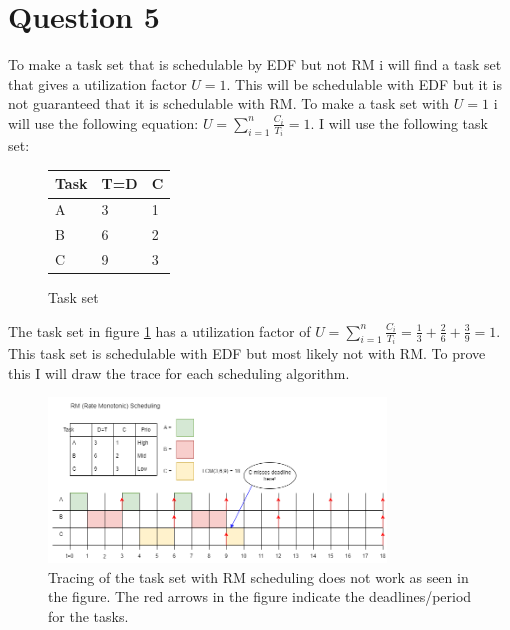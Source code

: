 \section{Question 5}

    To make a task set that is schedulable by EDF but not RM i will find a task set that gives a utilization factor $U = 1$. This will be schedulable with EDF but it is not guaranteed that it is schedulable with RM. To make a task set with $U = 1$ i will use the following equation: $U = \sum_{i=1}^{n} \frac{C_i}{T_i} = 1$. I will use the following task set: 

    \renewcommand{\arraystretch}{1.4}
        \begin{figure}[H]
        \centering
        \begin{minipage}{0.7\textwidth}
            \begin{table}[H]
            \centering
            \begin{tabular}{|l|l|l|}
                \hline
                \textbf{Task}   & \textbf{T=D}  & \textbf{C}  \\ \hline
                A               & 3             & 1           \\ \hline
                B               & 6             & 2           \\ \hline
                C               & 9             & 3           \\ \hline
            \end{tabular}
            \end{table}
        \end{minipage}%
        \caption{Task set}
        \label{fig:Q5tasks}
        \end{figure}
    \renewcommand{\arraystretch}{1.0}

    The task set in figure \ref{fig:Q5tasks} has a utilization factor of $U = \sum_{i=1}^{n} \frac{C_i}{T_i} = \frac{1}{3} + \frac{2}{6} + \frac{3}{9} = 1$. This task set is schedulable with EDF but most likely not with RM. To prove this I will draw the trace for each scheduling algorithm.\\

    \begin{figure}[H]
        \centering
        \includegraphics[width=0.8\textwidth]{images/Ass1Q5RM.png}
        \caption{Tracing of the task set with RM scheduling does not work as seen in the figure. The red arrows in the figure indicate the deadlines/period for the tasks.}
        \label{fig:Q5RMtrace}
    \end{figure}

